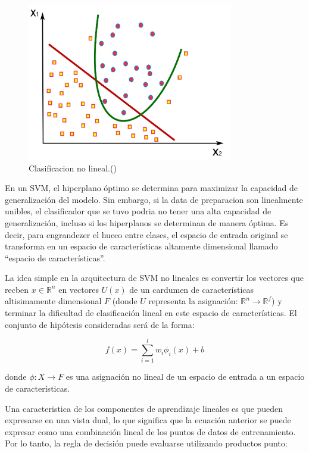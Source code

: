 \begin{figure}[H]
	\begin{center}
		\includegraphics[width=0.8\textwidth]{2/figures/svm4.jpeg}
		\caption{Clasificacion no lineal.(\cite{tecnica3})}
	\end{center}
\end{figure}

En un SVM, el hiperplano óptimo se determina para maximizar la capacidad de generalización del modelo. Sin embargo, si la data de preparacion son linealmente unibles, el clasificador que se tuvo podria no tener una alta capacidad de generalización, incluso si los hiperplanos se determinan de manera óptima. Es decir, para engrandezer el hueco entre clases, el espacio de entrada original se transforma en un espacio de características altamente dimensional llamado ``espacio de características''.

La idea simple en la arquitectura de SVM no lineales es convertir los vectores que recben $x \in \mathbb{R}^n$ en vectores $U(x)$ de un cardumen de características altisimamente dimensional $F$ (donde $U$ representa la asignación: $\mathbb{R}^n \rightarrow \mathbb{R}^f$) y terminar la dificultad de clasificación lineal en este espacio de características. El conjunto de hipótesis consideradas será de la forma:

\[
f(x) = \sum_{i=1}^{l} w_i \phi_i(x) + b
\]

donde $\phi: X \rightarrow F$ es una asignación no lineal de un espacio de entrada a un espacio de características.

Una caracteristica de los componentes de aprendizaje lineales es que pueden expresarse en una vista dual, lo que significa que la ecuación anterior se puede expresar como una combinación lineal de los puntos de datos de entrenamiento. Por lo tanto, la regla de decisión puede evaluarse utilizando productos punto:

